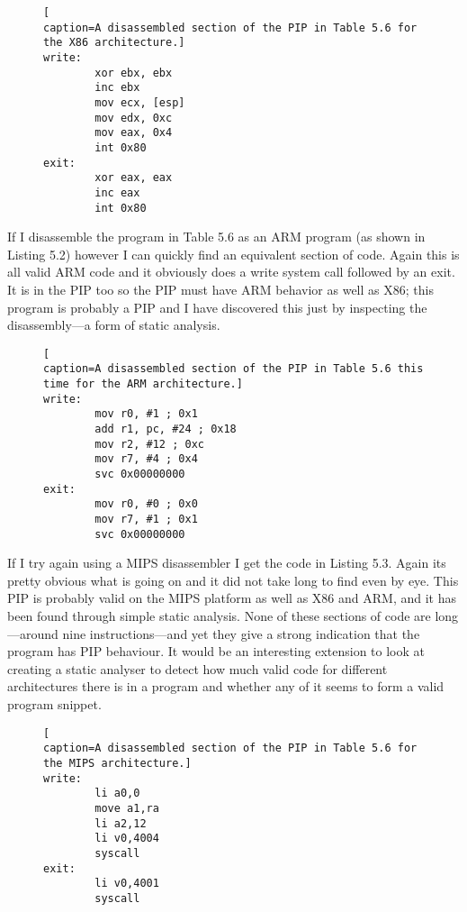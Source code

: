 \documentclass[10pt]{book}
\begin{document}
\begin{figure}
\begin{lstlisting}[
caption=A disassembled section of the PIP in Table 5.6 for the X86 architecture.]
write:
        xor ebx, ebx
        inc ebx
        mov ecx, [esp]
        mov edx, 0xc
        mov eax, 0x4
        int 0x80
exit:
        xor eax, eax
        inc eax
        int 0x80
\end{lstlisting}
\end{figure}

If I disassemble the program in Table 5.6 as an ARM program (as shown in
Listing 5.2) however I can quickly find an equivalent section of code.
Again this is all valid ARM code and it obviously does a write system
call followed by an exit. It is in the PIP too so the PIP must have ARM
behavior as well as X86; this program is probably a PIP and I have
discovered this just by inspecting the disassembly---a form of static
analysis.

\begin{figure}
\begin{lstlisting}[
caption=A disassembled section of the PIP in Table 5.6 this time for the ARM architecture.]
write:
        mov r0, #1 ; 0x1
        add r1, pc, #24 ; 0x18
        mov r2, #12 ; 0xc
        mov r7, #4 ; 0x4
        svc 0x00000000
exit:
        mov r0, #0 ; 0x0
        mov r7, #1 ; 0x1
        svc 0x00000000
\end{lstlisting}
\end{figure}
If I try again using a MIPS disassembler I get the code in Listing 5.3.
Again its pretty obvious what is going on and it did not take long to
find even by eye. This PIP is probably valid on the MIPS platform as
well as X86 and ARM, and it has been found through simple static
analysis. None of these sections of code are long---around nine
instructions---and yet they give a strong indication that the program
has PIP behaviour. It would be an interesting extension to look at
creating a static analyser to detect how much valid code for different
architectures there is in a program and whether any of it seems to form
a valid program snippet.

\begin{figure}
\begin{lstlisting}[
caption=A disassembled section of the PIP in Table 5.6 for the MIPS architecture.]
write:
        li a0,0
        move a1,ra
        li a2,12
        li v0,4004
        syscall
exit:
        li v0,4001
        syscall
\end{lstlisting}
\end{figure}
\end{document}
